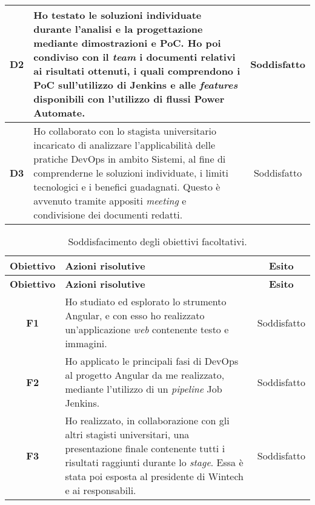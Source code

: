 \begin{longtable}{|c|p{8cm}|c|}
    \hline \textbf{D2}  & Ho testato le soluzioni individuate durante l'analisi e la progettazione mediante dimostrazioni e PoC. Ho poi condiviso con il \emph{team} i documenti relativi ai risultati ottenuti, i quali comprendono i PoC sull'utilizzo di Jenkins e alle \emph{features} disponibili con l'utilizzo di flussi Power Automate. & Soddisfatto\\
    \hline \textbf{D3}  & Ho collaborato con lo stagista universitario incaricato di analizzare l'applicabilità delle pratiche \gls{DevOps} in ambito \gls{Sistemi}, al fine di comprenderne le soluzioni individuate, i limiti tecnologici e i benefici guadagnati. Questo è avvenuto tramite appositi \emph{meeting} e condivisione dei documenti redatti. & Soddisfatto\\
\end{longtable}

\begin{longtable}{|c|p{8cm}|c|}
    \caption{Soddisfacimento degli obiettivi facoltativi.}
    \label{tab:soddObbFacoltativi}\\
    \hline \textbf{Obiettivo} & \textbf{Azioni risolutive} & \textbf{Esito}\\  \endfirsthead
    \hline \textbf{Obiettivo} & \textbf{Azioni risolutive} & \textbf{Esito}\\  \endhead
    \hline \endfoot
    \hline \endlastfoot
    \hline \textbf{F1}  & Ho studiato ed esplorato lo strumento Angular, e con esso ho realizzato un'applicazione \emph{web} contenente testo e immagini. & Soddisfatto\\
    \hline \textbf{F2}  & Ho applicato le principali fasi di \gls{DevOps} al progetto Angular da me realizzato, mediante l'utilizzo di un \emph{pipeline} Job Jenkins. & Soddisfatto\\
    \hline \textbf{F3}  & Ho realizzato, in collaborazione con gli altri stagisti universitari, una presentazione finale contenente tutti i risultati raggiunti durante lo \emph{stage}. Essa è stata poi esposta al presidente di Wintech e ai responsabili. & Soddisfatto\\
\end{longtable}
\endgroup


